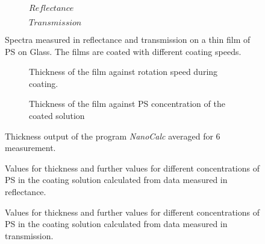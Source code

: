 \begin{figure}[ht]
    \centering
    \begin{subfigure}[b]{0.70\textwidth}
        \centering
        
        \caption{$Reflectance$}
        \label{fig:y equals x}
    \end{subfigure}  
    

    \begin{subfigure}[b]{0.70\textwidth}
        \centering
           
        \caption{$Transmission$} 
        \label{fig:three sin x}
    \end{subfigure}

    \caption{Spectra measured in reflectance and transmission on a thin film of PS on Glass. The films are coated with different coating speeds.}
    \label{fig:SpecRefTrans}
\end{figure}


\begin{figure}[h]
    \centering
    \begin{subfigure}[b]{\textwidth}
        \centering
        
        \caption{Thickness of the film against rotation speed during coating.}
        \label{fig:VglMethConcThick}
    \end{subfigure}

    \vspace{1cm}
    \begin{subfigure}[b]{\textwidth}
        \centering
           
        \caption{Thickness of the film against PS concentration of the coated solution} 
        \label{fig:VglMethRotThick}
    \end{subfigure}

    \caption{Thickness output of the program \textit{NanoCalc} averaged for 6 measurement.}
    \label{fig:thickconcrpm}
\end{figure}

\begin{figure}[h]
    
    \caption{Values for thickness and further values for different concentrations of PS in the coating solution calculated from data measured in reflectance.}
    \label{tab:ConcThickRef}
\end{figure}

\begin{figure}[h]
    
    \caption{Values for thickness and further values for different concentrations of PS in the coating solution calculated from data measured in transmission.}
    \label{tab:ConcThickTrans}
\end{figure}

